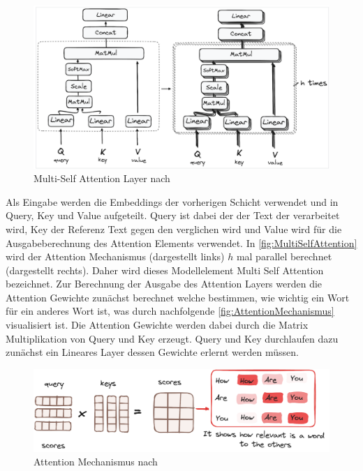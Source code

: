 \documentclass[conference]{IEEEtran}
\begin{document}
\begin{figure}[htbp]
    \centerline{\includegraphics[width=\linewidth]{Bilder/MultiheadSelfAttention.png}}
    \caption{Multi-Self Attention Layer nach \cite{WieTransformatorenFunktionieren}}
\label{fig:MultiSelfAttention}
\end{figure}
Als Eingabe werden die Embeddings der vorherigen Schicht verwendet und in Query, Key und Value aufgeteilt. Query ist dabei der der Text der verarbeitet wird, Key der Referenz Text gegen den verglichen wird und Value wird für die Ausgabeberechnung des Attention Elements verwendet.
In \autoref{fig:MultiSelfAttention} wird der Attention Mechanismus (dargestellt links) $h$ mal parallel berechnet (dargestellt rechts). Daher wird dieses Modellelement Multi Self Attention bezeichnet. 
Zur Berechnung der Ausgabe des Attention Layers werden die Attention Gewichte zunächst berechnet welche bestimmen, wie wichtig ein Wort für ein anderes Wort ist, was durch nachfolgende \autoref{fig:AttentionMechanismus} visualisiert ist. Die Attention Gewichte werden dabei durch die Matrix Multiplikation von Query und Key erzeugt. Query und Key durchlaufen dazu zunächst ein Lineares Layer dessen Gewichte erlernt werden müssen.
\begin{figure}[htbp]
    \centerline{\includegraphics[width=\linewidth]{Bilder/AttentionMechanismus.png}}
    \caption{Attention Mechanismus nach \cite{WieTransformatorenFunktionieren}}
\label{fig:AttentionMechanismus}
\end{figure}
\end{document}
